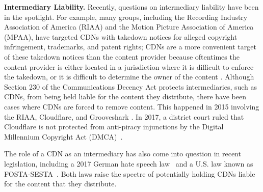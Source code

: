 \textbf{Intermediary Liability.}
Recently, questions on intermediary liability have been in the spotlight.  For example, many groups, including the Recording Industry Association of America (RIAA) and the Motion Picture Association of America (MPAA), have targeted CDNs with takedown notices for alleged copyright infringement, trademarks, and patent rights; CDNs are a more convenient target of these takedown notices than 
the content provider because oftentimes the content provider is either located in a jurisdiction where it is difficult to enforce the takedown, 
or it is difficult to determine the owner of the content \cite{medium_copyright,eff_copyright}.
Although Section 230 of the Communications Decency Act protects intermediaries,
such as CDNs, from being held
liable for the content they distribute, there have been cases where CDNs are forced
to remove content. This happened in 2015 involving the RIAA, Cloudflare, and Grooveshark \cite{techdirt_copyright}. In 2017, a district court ruled that Cloudflare is not protected from anti-piracy injunctions by the Digital Millennium Copyright Act (DMCA)~\cite{stack_copyright}.

The role of a CDN as an intermediary has also come into question in recent legislation, including a 2017 German hate speech law~\cite{netenforementact} and a U.S. law known as FOSTA-SESTA~\cite{fosta_sesta}. Both laws raise the spectre of potentially holding CDNs liable for the content that they distribute.%

